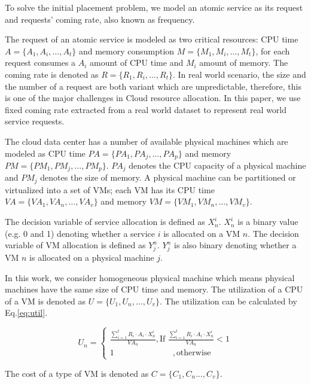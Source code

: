 To solve the initial placement problem, we model an atomic service as its request and requests' coming rate, also known as frequency. 


The request of an atomic service is modeled as two critical resources: 
CPU time $A = \{A_1, A_i, \dots, A_t \}$ and 
memory consumption $M = \{M_1, M_i, \dots, M_t \}$, 
for each request consumes a $A_i$ amount of CPU time 
and $M_i$ amount of memory. 
The coming rate is denoted as $R = \{R_1, R_i, \dots, R_t \}$. 
In real world scenario, the size and the number of a request are both variant 
which are unpredictable, therefore, this is one of the major challenges in Cloud resource allocation. 
In this paper, we use fixed coming rate extracted from a real world dataset to represent real world service requests. 
 
The cloud data center has a number of available physical machines which are modeled as
CPU time $PA = \{PA_1, PA_j, \dots, PA_p\}$ and memory
$PM = \{PM_1, PM_j, \dots, PM_p\}$. $PA_j$ denotes the CPU capacity of a physical machine 
and $PM_j$ denotes the size of memory. A physical machine can be partitioned or
 virtualized into a set of VMs; 
 each VM has its 
 CPU time $VA = \{VA_1, VA_n, \dots, VA_v\}$ and 
 memory $VM = \{VM_1, VM_n, \dots, VM_v\}$. 


The decision variable of service allocation is defined as $X^i_n$. $X^i_n$
is a binary value (e.g. 0 and 1) denoting whether a
service $i$ is allocated on a VM $n$.
The decision variable of VM allocation is defined as $Y^n_j$. $Y^n_j$
is also binary denoting whether a
VM $n$ is allocated on a physical machine $j$.


 In this work, we consider homogeneous physical machine which means physical machines have the same size of CPU time and memory. 
 The utilization of a CPU of a VM is denoted as $U = \{U_1, U_n, \dots, U_v\}$. 
 The utilization can be calculated by Eq.\ref{eq:util}.

\begin{equation}
\label{eq:util}
  U_n =
  \begin{cases} 
    \frac{\sum_{i = 1}^t R_i \cdot A_i \cdot X^i_n}{VA_n}, \text{If }  \frac{\sum_{i = 1}^t R_i \cdot A_i \cdot X^i_n}{VA_n} < 1 \\
    1   \quad\quad\quad\quad\quad\quad\quad ,\text{otherwise}
  \end{cases}
\end{equation}

The cost of a type of VM is denoted as $C = \{C_1, C_n \dots, C_v\}$. 



